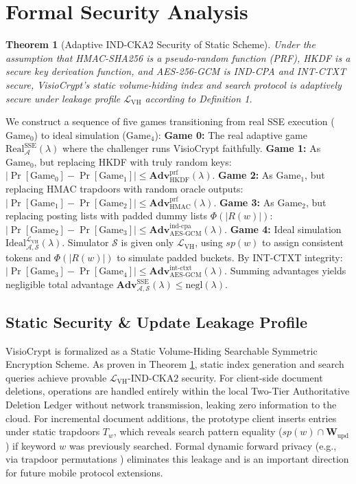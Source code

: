 \documentclass[10pt,conference]{IEEEtran}
\newenvironment{revised}{\color{revcolor}}{}
\newtheorem{theorem}{Theorem}
\newenvironment{revised}{\color{revcolor}}{}
\begin{document}
\begin{revised}
\section{Formal Security Analysis}
\begin{theorem}[Adaptive IND-CKA2 Security of Static Scheme]
\label{thm:security}
Under the assumption that HMAC-SHA256 is a pseudo-random function (PRF), HKDF is a secure key derivation function, and AES-256-GCM is IND-CPA and INT-CTXT secure, VisioCrypt's static volume-hiding index and search protocol is adaptively secure under leakage profile $\mathcal{L}_{\text{VH}}$ according to Definition 1.
\end{theorem}

\begin{IEEEproof}
We construct a sequence of five games transitioning from real SSE execution ($\text{Game}_0$) to ideal simulation ($\text{Game}_4$):
\textbf{Game 0:} The real adaptive game $\text{Real}_{\mathcal{A}}^{\text{SSE}}(\lambda)$ where the challenger runs VisioCrypt faithfully.
\textbf{Game 1:} As $\text{Game}_0$, but replacing HKDF with truly random keys: $|\Pr[\text{Game}_0] - \Pr[\text{Game}_1]| \le \mathbf{Adv}_{\text{HKDF}}^{\text{prf}}(\lambda)$.
\textbf{Game 2:} As $\text{Game}_1$, but replacing HMAC trapdoors with random oracle outputs: $|\Pr[\text{Game}_1] - \Pr[\text{Game}_2]| \le \mathbf{Adv}_{\text{HMAC}}^{\text{prf}}(\lambda)$.
\textbf{Game 3:} As $\text{Game}_2$, but replacing posting lists with padded dummy lists $\Phi(|R(w)|)$: $|\Pr[\text{Game}_2] - \Pr[\text{Game}_3]| \le \mathbf{Adv}_{\text{AES-GCM}}^{\text{ind-cpa}}(\lambda)$.
\textbf{Game 4:} Ideal simulation $\text{Ideal}_{\mathcal{A},\mathcal{S}}^{\mathcal{L}_{\text{VH}}}(\lambda)$. Simulator $\mathcal{S}$ is given only $\mathcal{L}_{\text{VH}}$, using $sp(w)$ to assign consistent tokens and $\Phi(|R(w)|)$ to simulate padded buckets. By INT-CTXT integrity: $|\Pr[\text{Game}_3] - \Pr[\text{Game}_4]| \le \mathbf{Adv}_{\text{AES-GCM}}^{\text{int-ctxt}}(\lambda)$.
Summing advantages yields negligible total advantage $\mathbf{Adv}_{\mathcal{A},\mathcal{S}}^{\text{SSE}}(\lambda) \le \text{negl}(\lambda)$.
\end{IEEEproof}

\subsection{Static Security \& Update Leakage Profile}
VisioCrypt is formalized as a Static Volume-Hiding Searchable Symmetric Encryption Scheme. As proven in Theorem \ref{thm:security}, static index generation and search queries achieve provable $\mathcal{L}_{\text{VH}}\text{-IND-CKA2}$ security. For client-side document deletions, operations are handled entirely within the local Two-Tier Authoritative Deletion Ledger without network transmission, leaking zero information to the cloud. For incremental document additions, the prototype client inserts entries under static trapdoors $T_w$, which reveals search pattern equality ($sp(w) \cap \mathbf{W}_{\text{upd}}$) if keyword $w$ was previously searched. Formal dynamic forward privacy (e.g., via trapdoor permutations \cite{bost2016sophos}) eliminates this leakage and is an important direction for future mobile protocol extensions.


\end{revised}
\end{document}
